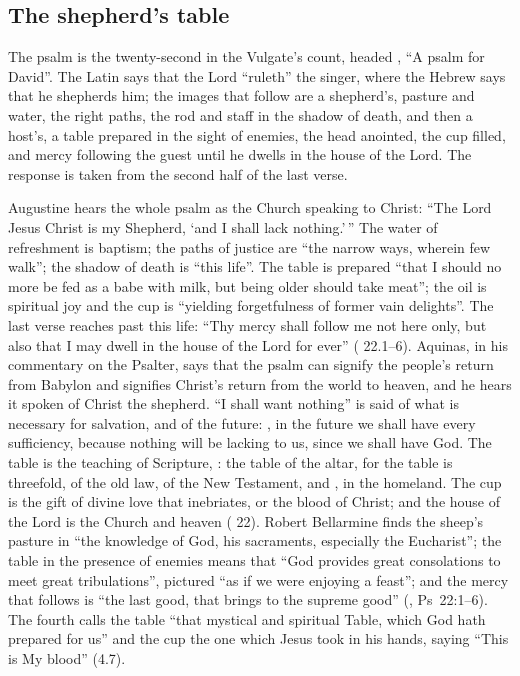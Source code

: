 \subsection{The shepherd's table}

The psalm is the twenty-second in the Vulgate's count, headed , ``A psalm for David''. The Latin says that the Lord ``ruleth'' the
singer, where the Hebrew says that he shepherds him; the images that follow
are a shepherd's, pasture and water, the right paths, the rod and staff in the
shadow of death, and then a host's, a table prepared in the sight of enemies,
the head anointed, the cup filled, and mercy following the guest until he
dwells in the house of the Lord. The response is taken from the second half of
the last verse.

Augustine hears the whole psalm as the Church speaking to Christ: ``The Lord
Jesus Christ is my Shepherd, `and I shall lack nothing.'\,'' The water of
refreshment is baptism; the paths of justice are ``the narrow ways, wherein few
walk''; the shadow of death is ``this life''. The table is prepared ``that I
should no more be fed as a babe with milk, but being older should take meat'';
the oil is spiritual joy and the cup is ``yielding forgetfulness of former vain
delights''. The last verse reaches past this life: ``Thy mercy shall follow me
not here only, but also that I may dwell in the house of the Lord for ever''
( 22.1--6). Aquinas, in his commentary on the
Psalter, says that the psalm can signify the people's return from Babylon and
signifies Christ's return from the world to heaven, and he hears it spoken
 of Christ the shepherd. ``I shall want nothing''
is said of what is necessary for salvation, and of the future: , in the future we shall have every sufficiency, because nothing will be
lacking to us, since we shall have God. The table is the teaching of
Scripture, : the table of the
altar, for the table is threefold, of the old law, of the New Testament, and
, in the homeland. The cup is the gift of divine love that
inebriates, or the blood of Christ; and the house of the Lord is the Church
 and heaven  ( 22). Robert Bellarmine finds the sheep's pasture in ``the knowledge of
God, his sacraments, especially the Eucharist''; the table in the presence of
enemies means that ``God provides great consolations to meet great
tribulations'', pictured ``as if we were enjoying a feast''; and the mercy that
follows is ``the last good, that brings to the supreme good'' (, Ps~22:1--6). The fourth 
calls the table ``that mystical and spiritual Table, which God hath prepared for
us'' and the cup the one which Jesus took in his hands, saying ``This is My
blood'' (4.7).

